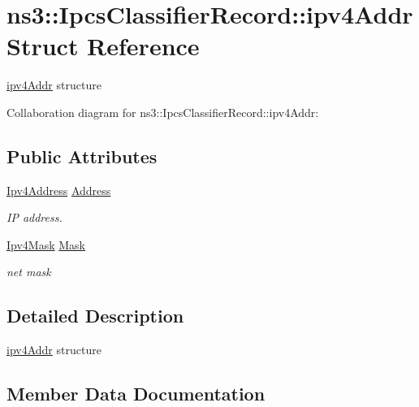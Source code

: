 \hypertarget{structns3_1_1IpcsClassifierRecord_1_1ipv4Addr}{}\section{ns3\+:\+:Ipcs\+Classifier\+Record\+:\+:ipv4\+Addr Struct Reference}
\label{structns3_1_1IpcsClassifierRecord_1_1ipv4Addr}


\hyperlink{structns3_1_1IpcsClassifierRecord_1_1ipv4Addr}{ipv4\+Addr} structure  




Collaboration diagram for ns3\+:\+:Ipcs\+Classifier\+Record\+:\+:ipv4\+Addr\+:
\subsection*{Public Attributes}
\begin{DoxyCompactItemize}
\item 
\hyperlink{classns3_1_1Ipv4Address}{Ipv4\+Address} \hyperlink{structns3_1_1IpcsClassifierRecord_1_1ipv4Addr_ac168bf6b3ab316103762f57a17b20936}{Address}
\begin{DoxyCompactList}\small\item\em IP address. \end{DoxyCompactList}\item 
\hyperlink{classns3_1_1Ipv4Mask}{Ipv4\+Mask} \hyperlink{structns3_1_1IpcsClassifierRecord_1_1ipv4Addr_a684496a8e016d090a337acbf4ceea959}{Mask}
\begin{DoxyCompactList}\small\item\em net mask \end{DoxyCompactList}\end{DoxyCompactItemize}


\subsection{Detailed Description}
\hyperlink{structns3_1_1IpcsClassifierRecord_1_1ipv4Addr}{ipv4\+Addr} structure 

\subsection{Member Data Documentation}
